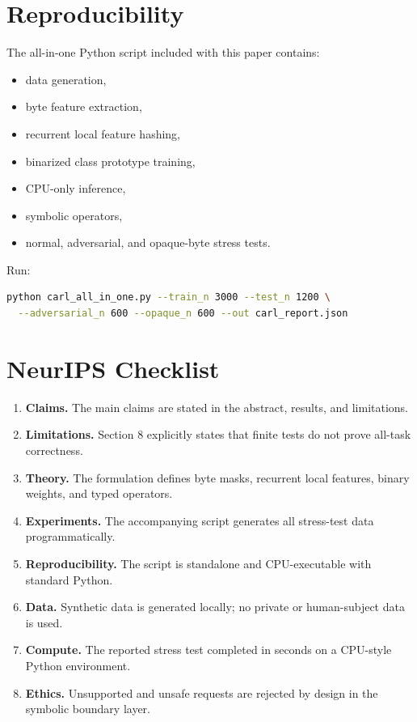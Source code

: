 \documentclass[10pt]{article}
\begin{document}
\section{Reproducibility}

The all-in-one Python script included with this paper contains:
\begin{itemize}[leftmargin=1.5em]
  \item data generation,
  \item byte feature extraction,
  \item recurrent local feature hashing,
  \item binarized class prototype training,
  \item CPU-only inference,
  \item symbolic operators,
  \item normal, adversarial, and opaque-byte stress tests.
\end{itemize}
Run:
\begin{lstlisting}[language=bash]
python carl_all_in_one.py --train_n 3000 --test_n 1200 \
  --adversarial_n 600 --opaque_n 600 --out carl_report.json
\end{lstlisting}

\section{NeurIPS Checklist}

\begin{enumerate}[leftmargin=1.5em]
  \item \textbf{Claims.} The main claims are stated in the abstract, results, and limitations.
  \item \textbf{Limitations.} Section 8 explicitly states that finite tests do not prove all-task correctness.
  \item \textbf{Theory.} The formulation defines byte masks, recurrent local features, binary weights, and typed operators.
  \item \textbf{Experiments.} The accompanying script generates all stress-test data programmatically.
  \item \textbf{Reproducibility.} The script is standalone and CPU-executable with standard Python.
  \item \textbf{Data.} Synthetic data is generated locally; no private or human-subject data is used.
  \item \textbf{Compute.} The reported stress test completed in seconds on a CPU-style Python environment.
  \item \textbf{Ethics.} Unsupported and unsafe requests are rejected by design in the symbolic boundary layer.
\end{enumerate}
\end{document}
